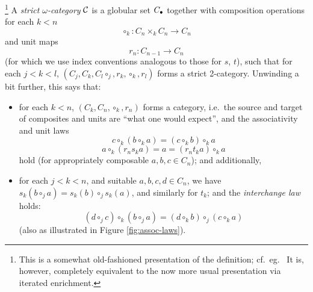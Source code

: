 \begin{definition}\footnote{This is a somewhat old-fashioned presentation of the definition; cf.\ eg.\ \cite{street:algebra-of-oriented-simplices}  It is, however, completely equivalent to the now more usual presentation via iterated enrichment.}
A \emph{strict $\omega$-category} $\mathcal{C}$ is a globular set $C_\bullet$ together with composition operations for each $k < n$
\[\circ_k \colon C_n \times_k C_n \to C_n\]
and unit maps
\[r_n \colon C_{n-1} \to C_n\]
(for which we use index conventions analogous to those for $s$, $t$),
 such that for each $j < k < l$, $(C_j,C_k,C_l \circ_j, r_k, \circ_k, r_l)$ forms a strict 2-category.  Unwinding a bit further, this says that:
\begin{itemize}
\item for each $k < n$, $(C_k,C_n, \circ_k, r_n)$ forms a category, i.e.\ the source and target of composites and units are ``what one would expect'', and the associativity and unit laws
\[ c \circ_k (b \circ_k a) = (c \circ_k b) \circ_k a\]
\[ a \circ_k (r_n s_k a) = a = (r_n t_k a) \circ_k a\]
hold (for appropriately composable $a, b, c \in C_n$); and additionally,
\item for each $j < k < n$, and suitable $a,b,c,d \in C_n$, we have $s_k(b \circ_j a) = s_k(b) \circ_j s_k(a)$, and similarly for $t_k$; and the \emph{interchange law} holds:
\[ (d \circ_j c) \circ_k (b \circ_j a) = (d \circ_k b) \circ_j (c \circ_k a)\]
(also as illustrated in Figure \ref{fig:assoc-laws}). 
\end{itemize}
\end{definition}

